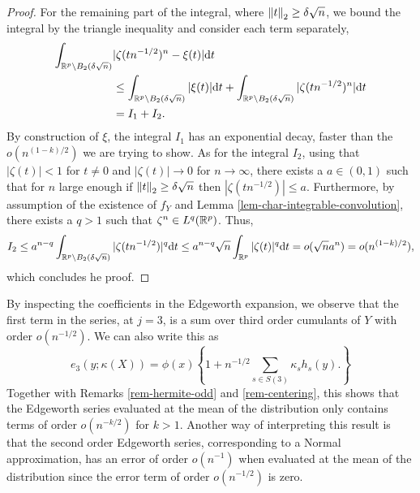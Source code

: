 \begin{proof}
    For the remaining part of the integral, where $\norm{t}_2 \geq \delta \sqrt{n}$, we bound the integral by the triangle inequality and consider each term separately,
    \begin{align*}
        \int_{\Rp \setminus B_2(\delta\sqrt{n})} &|\zeta(tn^{-1/2})^n - \xi(t)| \d t \\
        &\leq \int_{\Rp \setminus B_2(\delta\sqrt{n})} |\xi(t)| \d t + \int_{\Rp \setminus B_2(\delta\sqrt{n})} |\zeta(tn^{-1/2})^n| \d t\\
        &= I_1 + I_2.
    \end{align*}
    By construction of $\xi$, the integral $I_1$ has an exponential decay, faster than the $o(n^{(1 - k)/2})$ we are trying to show. As for the integral $I_2$, using that $|\zeta(t)| < 1$ for $t \neq 0$ and $|\zeta(t)| \rightarrow 0$ for $n \rightarrow \infty$, there exists a $a \in (0, 1)$ such that for $n$ large enough if $\norm{t}_2 \geq \delta\sqrt{n}$ then $|\zeta(tn^{-1/2})| \leq a$. Furthermore, by assumption of the existence of $f_Y$ and Lemma \ref{lem-char-integrable-convolution}, there exists a $q > 1$ such that $\zeta^n \in L^q(\Rp)$. Thus,
    \begin{equation*}
        I_2
        \leq a^{n-q} \int_{\Rp \setminus B_2(\delta\sqrt{n})} |\zeta(tn^{-1/2})|^q \d t 
        \leq a^{n-q}\sqrt{n}\intRp{t}{|\zeta(t)|^q} 
        = o(\sqrt{n}a^n) = o(n^{(1-k)/2}),
    \end{equation*}
    which concludes he proof.
\end{proof}

\begin{remark} \label{rem-edge-mean}
    By inspecting the coefficients in the Edgeworth expansion, we observe that the first term in the series, at $j = 3$, is a sum over third order cumulants of $Y$ with order $o(n^{-1/2})$. We can also write this as
    \begin{equation}
        e_3(y; \kappa(X)) = \phi(x) \left\{
            1 + n^{-1/2} \sum_{s \in S(3)} \kappa_s h_s(y).
        \right\}
    \end{equation}
    Together with Remarks \ref{rem-hermite-odd} and \ref{rem-centering}, this shows that the Edgeworth series evaluated at the mean of the distribution only contains terms of order $o(n^{-k/2})$ for $k > 1$. Another way of interpreting this result is that the second order Edgeworth series, corresponding to a Normal approximation, has an error of order $o(n^{-1})$ when evaluated at the mean of the distribution since the error term of order $o(n^{-1/2})$ is zero.
\end{remark}


